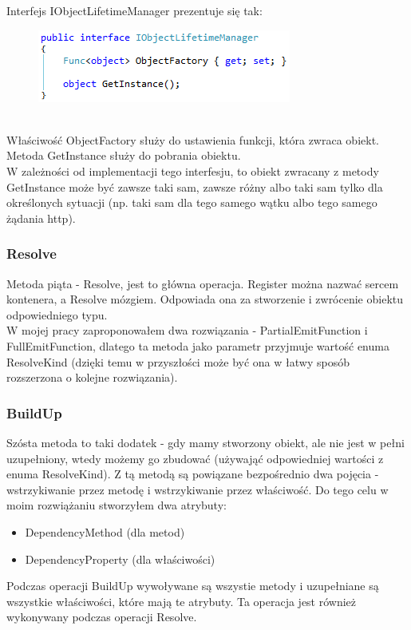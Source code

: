 \documentclass[12pt]{article}
\begin{document}
\clearpage
Interfejs IObjectLifetimeManager prezentuje się tak:
\begin{figure}[h]
	\begin{raggedleft}
  		\includegraphics{IObjectLifetimeManager.png}
	\end{raggedleft}
\end{figure}\\
Właściwość ObjectFactory służy do ustawienia funkcji, która zwraca obiekt. Metoda GetInstance służy do pobrania obiektu.\\
W zależności od implementacji tego interfesju, to obiekt zwracany z metody GetInstance może być zawsze taki sam, zawsze różny albo taki sam tylko dla określonych sytuacji (np. taki sam dla tego samego wątku albo tego samego żądania http).

\subsubsection{Resolve}
Metoda piąta - Resolve, jest to główna operacja. Register można nazwać sercem kontenera, a Resolve mózgiem. Odpowiada ona za stworzenie i zwrócenie obiektu odpowiedniego typu.\\
W mojej pracy zaproponowałem dwa rozwiązania - PartialEmitFunction i FullEmitFunction, dlatego ta metoda jako parametr przyjmuje wartość enuma ResolveKind (dzięki temu w przyszłości może być ona w łatwy sposób rozszerzona o kolejne rozwiązania).

\subsubsection{BuildUp}
Szósta metoda to taki dodatek - gdy mamy stworzony obiekt, ale nie jest w pełni uzupełniony, wtedy możemy go zbudować (używająć odpowiedniej wartości z enuma ResolveKind). Z tą metodą są powiązane bezpośrednio dwa pojęcia - wstrzykiwanie przez metodę i wstrzykiwanie przez właściwość. Do tego celu w moim rozwiążaniu stworzyłem dwa atrybuty:
\begin{itemize}
	\item DependencyMethod (dla metod)
	\item DependencyProperty (dla właściwości)
\end{itemize}
Podczas operacji BuildUp wywoływane są wszystie metody i uzupełniane są wszystkie właściwości, które mają te atrybuty. Ta operacja jest również wykonywany podczas operacji Resolve.\\
\end{document}
